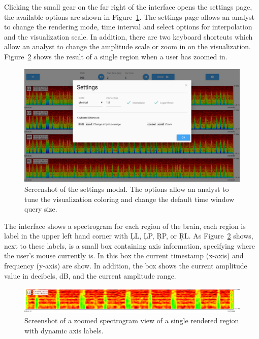 Clicking the small gear on the far right of the interface opens the
settings page, the available options are shown in Figure~\ref{fig:settings}.
The settings page allows an analyst to change the rendering mode, time interval
and select options for interpolation and the visualization scale. In addition,
there are two keyboard shortcuts which allow an analyst to change the amplitude
scale or zoom in on the visualization. Figure~\ref{fig:zoomed-region} shows the
result of a single region when a user has zoomed in. \\

\begin{figure}[h]
\begin{center}
\includegraphics[scale=0.35]{./img/settings.png}
\caption{Screenshot of the settings modal. The options allow an analyst to tune
  the visualization coloring and change the default time window query size.}
\label{fig:settings}
\end{center}
\end{figure}

The interface shows a spectrogram for each region of the brain, each region is
label in the upper left hand corner with \c{LL}, \c{LP}, \c{RP}, or \c{RL}.  As
Figure~\ref{fig:zoomed-region} shows, next to these labels, is a small box
containing axis information, specifying where the user's mouse currently is. In
this box the current timestamp (x-axis) and frequency (y-axis) are show. In
addition, the box shows the current amplitude value in decibels, dB, and the
current amplitude range. \\

\begin{figure}[h]
\begin{center}
\includegraphics[scale=0.35]{./img/zoomed-region.png}
\caption{Screenshot of a zoomed spectrogram view of a single rendered region
  with dynamic axis labels.}
\label{fig:zoomed-region}
\end{center}
\end{figure}

